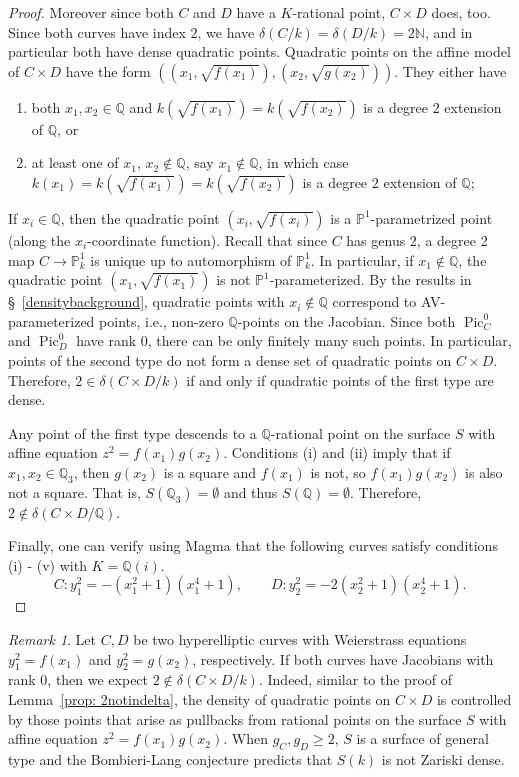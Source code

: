 \documentclass[a4paper,11pt]{amsart}
\theoremstyle{plain}
\theoremstyle{remark}
\newtheorem{remark}[thm]{Remark}
\newcommand{\bQ}{\mathbb{Q}}
\newcommand{\Pic}{\operatorname{Pic}}
\newcommand{\dendegs}{\delta}
\begin{document}
\begin{proof}
Moreover since both $C$ and $D$ have a $K$-rational point, $C \times D$ does, too.
Since both curves have index $2$, we have $\dendegs(C/k)=\dendegs(D/k)=2\mathbb{N}$, and in particular both have dense quadratic points.
Quadratic points on the affine model of $C \times D$ have the form $( (x_1, \sqrt{f(x_1)}), (x_2, \sqrt{g(x_2)}))$. They either have
\begin{enumerate}
    \item both $x_1,x_2\in \mathbb{Q}$ and $k(\sqrt{f(x_1)})=k(\sqrt{f(x_2)})$ is a degree $2$ extension of $\mathbb{Q}$, or
    \item at least one of $x_1$, $x_2 \notin \mathbb{Q}$, say $x_1\not\in\bQ$, in which case $k(x_1)=k(\sqrt{f(x_1)})=k(\sqrt{f(x_2)})$ is a degree $2$ extension of $\mathbb{Q}$;
\end{enumerate}
If $x_i\in \mathbb{Q}$, then the quadratic point $(x_i,\sqrt{f(x_i)})$ is a $\mathbb{P}^1$-parametrized point (along the $x_i$-coordinate function).
Recall that since $C$ has genus $2$, a degree 2 map $C\to \mathbb{P}^1_k$ is unique up to automorphism of $\mathbb{P}^1_k$. In particular, if $x_1\notin \mathbb{Q}$, the 
quadratic point $(x_1,\sqrt{f(x_1)})$ is not $\mathbb{P}^1$-parameterized.
By the results in \S~\ref{densitybackground}, quadratic points with $x_i\notin \mathbb{Q}$ correspond to AV-parameterized points, i.e., non-zero $\mathbb{Q}$-points on the Jacobian. Since both $\Pic^0_C$ and $\Pic^0_D$ have rank $0$, there can be only finitely many such points.
In particular, points of the second type do not form a dense set of quadratic points on $C\times D$. Therefore, $2\in \dendegs(C\times D/k)$ if and only if quadratic points of the first type are dense.

Any point of the first type descends to a $\mathbb{Q}$-rational point on the surface $S$ with affine equation $z^2 = f(x_1)g(x_2)$. 
Conditions (i) and (ii) imply that if $x_1,x_2 \in \mathbb{Q}_3$, then $g(x_2)$ is a square and $f(x_1)$ is not, 
so $f(x_1)g(x_2)$ is also not a square. 
That is, $S(\mathbb{Q}_3) = \emptyset$ and thus $S(\mathbb{Q}) = \emptyset$.
Therefore, $2 \not \in \dendegs(C \times D / \mathbb{Q})$.

Finally, one can verify using Magma that the following curves satisfy conditions (i) - (v) with $K = \mathbb{Q}(i)$.
$$
C \colon y_1^2=-(x_1^2 + 1)(x_1^4 + 1), \qquad  D \colon y_2^2= -2(x_2^2+1)(x_2^4+1).
$$
\end{proof}

\begin{remark}\label{relationtoBombieri-Lang}
Let $C,D$ be two hyperelliptic curves with Weierstrass equations $y_1^2=f(x_1)$ and $y_2^2=g(x_2)$, respectively. If both curves have Jacobians with rank $0$, then we expect $2\not\in\dendegs(C\times D/k)$. Indeed, similar to the proof of Lemma~\ref{prop: 2notindelta}, the density of quadratic points on $C\times D$ is controlled by those points that arise as pullbacks from rational points on the surface $S$ with affine equation $z^2 = f(x_1)g(x_2)$. 
When $g_C, g_D\geq 2$, $S$ is a surface of general type and the Bombieri-Lang conjecture predicts that $S(k)$ is not Zariski dense. 
\end{remark}
\end{document}
